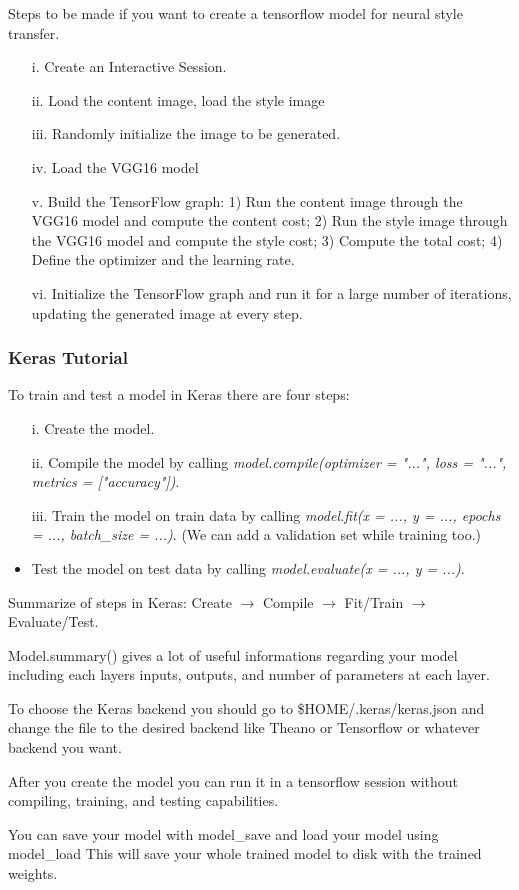 
Steps to be made if you want to create a tensorflow model for neural style transfer.

\begin{itemize}
    \item[i.] Create an Interactive Session.
    \item[ii.] Load the content image, load the style image
    \item[iii.] Randomly initialize the image to be generated.
    \item[iv.] Load the VGG16 model
    \item[v.] Build the TensorFlow graph: 1) Run the content image through the VGG16 model and compute the content cost; 2) Run the style image through the VGG16 model and compute the style cost; 3) Compute the total cost; 4) Define the optimizer and the learning rate.
    \item[vi.] Initialize the TensorFlow graph and run it for a large number of iterations, updating the generated image at every step.
\end{itemize}

\subsubsection{Keras Tutorial}
To train and test a model in Keras there are four steps:

\begin{itemize}
    \item[i.] Create the model.
    \item[ii.] Compile the model by calling \textit{model.compile(optimizer = "...", loss = "...", metrics = ["accuracy"])}.
    \item[iii.] Train the model on train data by calling \textit{model.fit(x = ..., y = ..., epochs = ..., batch\_size = ...)}. (We can add a validation set while training too.)
    \item Test the model on test data by calling \textit{model.evaluate(x = ..., y = ...)}.
\end{itemize}

Summarize of steps in Keras: Create $\to$ Compile $\to$ Fit/Train $\to$ Evaluate/Test.

Model.summary() gives a lot of useful informations regarding your model including each layers inputs, outputs, and number of parameters at each layer.

To choose the Keras backend you should go to \$HOME/.keras/keras.json and change the file to the desired backend like Theano or Tensorflow or whatever backend you want.

After you create the model you can run it in a tensorflow session without compiling, training, and testing capabilities.

You can save your model with model\_save and load your model using model\_load This will save your whole trained model to disk with the trained weights.